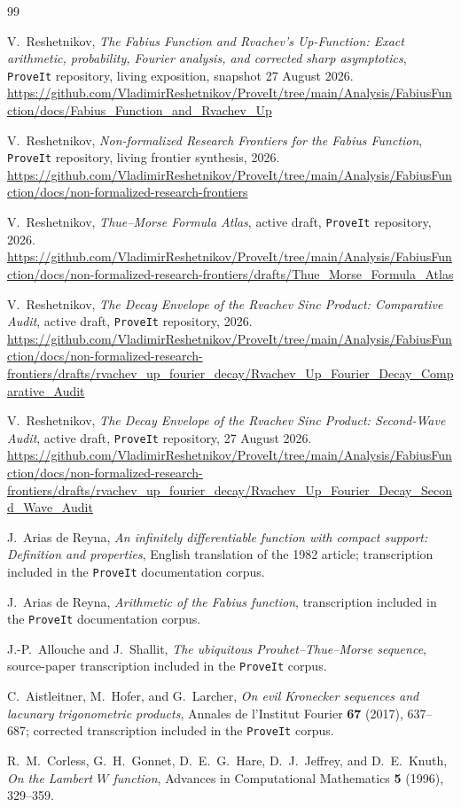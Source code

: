 \documentclass[11pt]{article}
\numberwithin{equation}{section}
\theoremstyle{definition}
\theoremstyle{remark}
\begin{document}
\begin{thebibliography}{99}

V.~Reshetnikov,
\emph{The Fabius Function and Rvachev's Up-Function: Exact arithmetic, probability,
Fourier analysis, and corrected sharp asymptotics},
\texttt{ProveIt} repository, living exposition, snapshot 27 August 2026.
\url{https://github.com/VladimirReshetnikov/ProveIt/tree/main/Analysis/FabiusFunction/docs/Fabius_Function_and_Rvachev_Up}

V.~Reshetnikov,
\emph{Non-formalized Research Frontiers for the Fabius Function},
\texttt{ProveIt} repository, living frontier synthesis, 2026.
\url{https://github.com/VladimirReshetnikov/ProveIt/tree/main/Analysis/FabiusFunction/docs/non-formalized-research-frontiers}

V.~Reshetnikov,
\emph{Thue--Morse Formula Atlas}, active draft, \texttt{ProveIt} repository, 2026.
\url{https://github.com/VladimirReshetnikov/ProveIt/tree/main/Analysis/FabiusFunction/docs/non-formalized-research-frontiers/drafts/Thue_Morse_Formula_Atlas}

V.~Reshetnikov,
\emph{The Decay Envelope of the Rvachev Sinc Product: Comparative Audit},
active draft, \texttt{ProveIt} repository, 2026.
\url{https://github.com/VladimirReshetnikov/ProveIt/tree/main/Analysis/FabiusFunction/docs/non-formalized-research-frontiers/drafts/rvachev_up_fourier_decay/Rvachev_Up_Fourier_Decay_Comparative_Audit}

V.~Reshetnikov,
\emph{The Decay Envelope of the Rvachev Sinc Product: Second-Wave Audit},
active draft, \texttt{ProveIt} repository, 27 August 2026.
\url{https://github.com/VladimirReshetnikov/ProveIt/tree/main/Analysis/FabiusFunction/docs/non-formalized-research-frontiers/drafts/rvachev_up_fourier_decay/Rvachev_Up_Fourier_Decay_Second_Wave_Audit}

J.~Arias de Reyna,
\emph{An infinitely differentiable function with compact support: Definition and
properties}, English translation of the 1982 article; transcription included in the
\texttt{ProveIt} documentation corpus.

J.~Arias de Reyna,
\emph{Arithmetic of the Fabius function}, transcription included in the
\texttt{ProveIt} documentation corpus.

J.-P.~Allouche and J.~Shallit,
\emph{The ubiquitous Prouhet--Thue--Morse sequence}, source-paper transcription included
in the \texttt{ProveIt} corpus.

C.~Aistleitner, M.~Hofer, and G.~Larcher,
\emph{On evil Kronecker sequences and lacunary trigonometric products},
Annales de l'Institut Fourier \textbf{67} (2017), 637--687; corrected transcription included
in the \texttt{ProveIt} corpus.

R.~M.~Corless, G.~H.~Gonnet, D.~E.~G.~Hare, D.~J.~Jeffrey, and D.~E.~Knuth,
\emph{On the Lambert $W$ function},
Advances in Computational Mathematics \textbf{5} (1996), 329--359.

\end{thebibliography}
\end{document}
